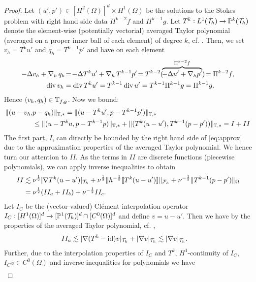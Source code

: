 \documentclass[pdflatex,sn-mathphys,Numbered]{sn-jnl}%
\theoremstyle{remark}%
\theoremstyle{definition}%
\begin{document}
\begin{proof}
  Let $(u',p') \in [H^{2}(\Omega)]^d \times H^{1}(\Omega)$ be the
  solutions to the Stokes problem with right hand side data
  $\Pi^{k-2}f$ and $\Pi^{k-1}g$. Let $T^k: L^1({\mathcal{T}_h}) \to \mathbb{P}^k({\mathcal{T}_h})$
  denote the element-wise (potentially vectorial) averaged Taylor
  polynomial (averaged on a proper inner ball of each element) of
  degree $k$, cf. \cite{brennerscott}. Then, we set $v_h = T^k u'$ and
  $q_h = T^{k-1} p'$ and have on each element
\begin{align*}
  -\Delta v_h + \operatorname{\nabla}_h q_h\! &=\! - \Delta T^k u' + \operatorname{\nabla}_h T^{k-1} p'\! 
  = T^{k-2}(\! \overbrace{- \Delta u' + \operatorname{\nabla}_h \!p'}^{\Pi^{k-2} f} )\! = \Pi^{k-2} f, \\
 \operatorname{\mathrm{div}} v_h &= \operatorname{\mathrm{div}} T^k u' = T^{k-1} \operatorname{\mathrm{div}} u' = T^{k-1} \Pi^{k-1} g = \Pi^{k-1} g.
\end{align*}
Hence $(v_h,q_h) \in \mathbb{T}_{f,g}$.
Now we bound:
\begin{align*}
  \Vert (u-v_h,&p-q_h) \Vert_{\mathbb{T},\ast} 
= \Vert (u-T^ku',p-T^{k-1}p') \Vert_{\mathbb{T},\ast} \\
 &\leq \Vert (u-T^ku,p-T^{k-1}p) \Vert_{\mathbb{T},\ast} + \Vert (T^k(u-u'),T^{k-1}(p-p')) \Vert_{\mathbb{T},\ast} = 
 I + II
\end{align*}
The first part, $I$, can directly be bounded by the right hand side of \eqref{eq:approx} due to the approximation properties of the averaged Taylor polynomial. We hence turn our attention to $II$. As the terms in $II$ are discrete functions (piecewise polynomials), we can apply inverse inequalities to obtain
\begin{align*}
  II & \lesssim  \nu^{\frac12} \vert \nabla T^k (u-u') \vert_{{\mathcal{T}_h}} + \nu^{\frac12} \Vert h^{-\frac12} [\![T^k (u-u')]\!] \Vert_{{\mathcal{F}_h}} + \nu^{-\frac12} \Vert T^{k-1}(p - p') \Vert_{\Omega} \\ &= \nu^{\frac12} (II_a + II_b) + \nu^{-\frac12} II_c.
\end{align*}
Let $I_C$ be the (vector-valued) Clément interpolation operator $I_C:
[H^1(\Omega)]^d \to [\mathbb{P}^1({\mathcal{T}_h})]^d\cap [C^0(\Omega)]^d$ and define $v
= u -u'$. Then we have by the properties of the averaged Taylor
polynomial, cf. \cite[Lemma 4.3.8]{brennerscott},
\begin{align*}
  II_a & \lesssim  \vert  \nabla (T^k - \operatorname{id}) v \vert_{{\mathcal{T}_h}} + \vert  \nabla v \vert_{{\mathcal{T}_h}} \lesssim \vert  \nabla v \vert_{{\mathcal{T}_h}}.
\end{align*}
  Further, due to the interpolation properties of $I_C$ and $T^k$, $H^1$-continuity of $I_C$, $I_C v \in C^0(\Omega)$ and inverse inequalities for polynomials we have
  \begin{align*}

\end{align*}
\end{proof}
\end{document}

